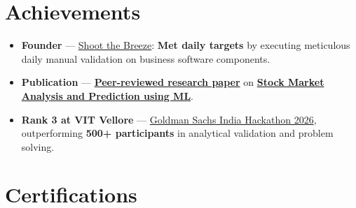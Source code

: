 \documentclass[a4paper,11pt]{article}
\newcommand{\ulink}[2]{\href{#1}{#2}}
\begin{document}
\section{Achievements}
\vspace{2pt}

\begin{itemize}[nosep, leftmargin=1.5em, itemsep=2pt, topsep=2pt]
  \item {\color[HTML]{0A0A0A}\fontsize{11}{14}\selectfont \textbf{Founder} --- \ulink{https://shoot-the-breeze.vercel.app}{Shoot the Breeze}: \textbf{Met daily targets} by executing meticulous daily manual validation on business software components.}
  \item {\color[HTML]{0A0A0A}\fontsize{11}{14}\selectfont \textbf{Publication} --- \ulink{https://www.elruha.org/_files/ugd/614b1f_6b95e1b697bf452b9907ba46e0151c05.pdf\#page=774}{\textbf{Peer-reviewed research paper}} on \ulink{https://github.com/su-jin1425/Set-Project}{\textbf{Stock Market Analysis and Prediction using ML}}.}
  \item {\color[HTML]{0A0A0A}\fontsize{11}{14}\selectfont \textbf{Rank 3 at VIT Vellore} --- \ulink{https://www.hackerrank.com/contests/goldman-sachs-india-hackathon-2026-cs/leaderboard}{Goldman Sachs India Hackathon 2026}, outperforming \textbf{500+ participants} in analytical validation and problem solving.}
\end{itemize}

\section{Certifications}
\vspace{2pt}
\end{document}
